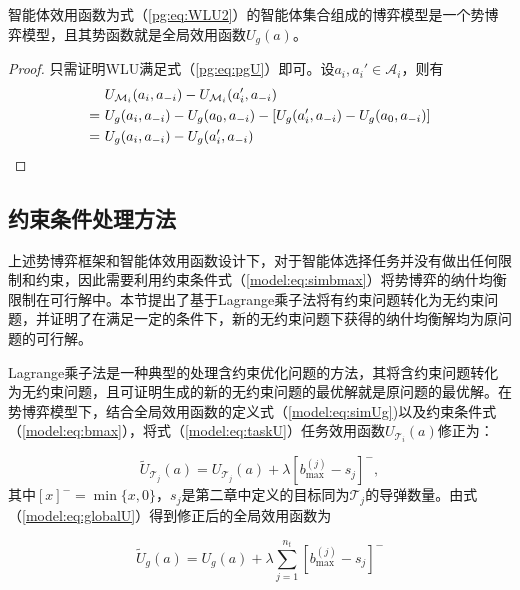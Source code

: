 \begin{proposition}[WLU可行性]
\label{pg:pro:mWLU}
	智能体效用函数为式（\ref{pg:eq:WLU2}）的智能体集合组成的博弈模型是一个势博弈模型，且其势函数就是全局效用函数$U_g(a)$。
	
	\begin{proof}
	只需证明WLU满足式（\ref{pg:eq:pgU}）即可。设$a_i,a_i' \in \mathcal{A}_i$，则有
	\begin{align}
		&\ U_{\mathcal{M}_i}(a_i,a_{-i}) - U_{\mathcal{M}_i}(a_i',a_{-i})\notag\\
		=&\ U_g(a_i,a_{-i}) - U_g(a_0,a_{-i}) - [U_g(a_i',a_{-i}) - U_g(a_0,a_{-i})]\notag\\
		=&\ U_g(a_i,a_{-i}) - U_g(a_i',a_{-i}) \notag
	\end{align}
	\end{proof}
\end{proposition}



\subsection{约束条件处理方法}
\label{pg:mWLU}

上述势博弈框架和智能体效用函数设计下，对于智能体选择任务并没有做出任何限制和约束，因此需要利用约束条件式（\ref{model:eq:simbmax}）将势博弈的纳什均衡限制在可行解中。本节提出了基于Lagrange乘子法将有约束问题转化为无约束问题，并证明了在满足一定的条件下，新的无约束问题下获得的纳什均衡解均为原问题的可行解。

Lagrange乘子法是一种典型的处理含约束优化问题的方法，其将含约束问题转化为无约束问题，且可证明生成的新的无约束问题的最优解就是原问题的最优解。在势博弈模型下，结合全局效用函数的定义式（\ref{model:eq:simUg})以及约束条件式（\ref{model:eq:bmax}），将式（\ref{model:eq:taskU}）任务效用函数$U_{\mathcal{T}_i}(a)$修正为：

\begin{equation}
\label{pg:eq:newTaskU}
	\widetilde U_{\mathcal{T}_j}(a) = U_{\mathcal{T}_j}(a) + \lambda [b_{\text{max}}^{(j)} - s_j]^-,
\end{equation}
其中$[x]^-=\min\{x,0\}$，$s_j$是第二章中定义的目标同为$\mathcal{T}_j$的导弹数量。由式（\ref{model:eq:globalU}）得到修正后的全局效用函数为

\begin{equation}
\label{pg:eq:newglobalU}
		\widetilde U_g(a) = U_g(a) +  \lambda \sum_{j=1}^{n_t}[b_{\text{max}}^{(j)} - s_j]^-
	\end{equation}

